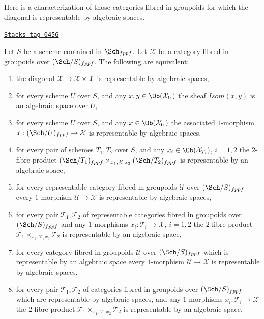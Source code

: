 Here is a characterization of those categories fibred in groupoids
for which the diagonal is representable by algebraic spaces.

\begin{lemma}
\label{algebraic-lemma-representable-diagonal}
\href{https://stacks.math.columbia.edu/tag/045G}{\texttt{Stacks tag 045G}}

Let $S$ be a scheme contained in $\Sch_{fppf}$.
Let $\mathcal{X}$ be a category fibred in groupoids over
$(\Sch/S)_{fppf}$. The following are equivalent:
\begin{enumerate}
\item the diagonal $\mathcal{X} \to \mathcal{X} \times \mathcal{X}$
is representable by algebraic spaces,
\item for every scheme $U$ over $S$, and any
$x, y \in \Ob(\mathcal{X}_U)$ the sheaf
$\mathit{Isom}(x, y)$ is an algebraic space over $U$,
\item for every scheme $U$ over $S$, and any $x \in \Ob(\mathcal{X}_U)$
the associated $1$-morphism $x : (\Sch/U)_{fppf} \to \mathcal{X}$
is representable by algebraic spaces,
\item for every pair of schemes $T_1, T_2$ over $S$, and any
$x_i \in \Ob(\mathcal{X}_{T_i})$, $i = 1, 2$ the $2$-fibre product
$(\Sch/T_1)_{fppf} \times_{x_1, \mathcal{X}, x_2}
(\Sch/T_2)_{fppf}$
is representable by an algebraic space,
\item for every representable category fibred in groupoids $\mathcal{U}$
over $(\Sch/S)_{fppf}$ every $1$-morphism
$\mathcal{U} \to \mathcal{X}$ is representable by algebraic spaces,
\item for every pair $\mathcal{T}_1, \mathcal{T}_2$ of representable
categories fibred in groupoids over $(\Sch/S)_{fppf}$ and any
$1$-morphisms $x_i : \mathcal{T}_i \to \mathcal{X}$, $i = 1, 2$ the
$2$-fibre product $\mathcal{T}_1 \times_{x_1, \mathcal{X}, x_2} \mathcal{T}_2$
is representable by an algebraic space,
\item for every category fibred in groupoids $\mathcal{U}$
over $(\Sch/S)_{fppf}$ which is
representable by an algebraic space every $1$-morphism
$\mathcal{U} \to \mathcal{X}$ is representable by algebraic spaces,
\item for every pair $\mathcal{T}_1, \mathcal{T}_2$ of categories fibred
in groupoids over $(\Sch/S)_{fppf}$ which are representable
by algebraic spaces, and any $1$-morphisms
$x_i : \mathcal{T}_i \to \mathcal{X}$ the
$2$-fibre product $\mathcal{T}_1 \times_{x_1, \mathcal{X}, x_2} \mathcal{T}_2$
is representable by an algebraic space.
\end{enumerate}
\end{lemma}

